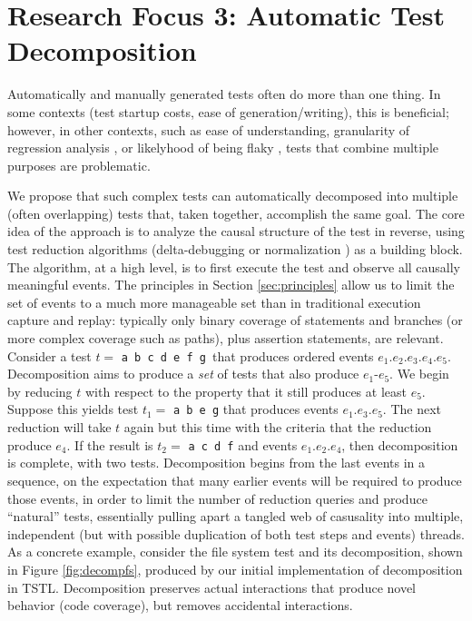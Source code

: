 
\section{Research Focus 3: Automatic Test Decomposition}

Automatically and manually generated tests often do more than one thing.  In some contexts (test startup costs, ease of generation/writing), this is beneficial; however, in other contexts, such as ease of understanding, granularity of regression analysis \cite{YooHarman}, or likelyhood of being flaky \cite{listfieldtestanalysis,palomba2017does}, tests that combine multiple purposes are problematic. 

We propose that such complex tests can automatically decomposed into multiple (often overlapping) tests that, taken together, accomplish the same goal.  The core idea of the approach is to analyze the causal structure of the test in reverse, using test reduction algorithms (delta-debugging \cite{DD} or normalization \cite{OneTest}) as a building block.  The algorithm, at a high level, is to first execute the test and observe all causally meaningful events.  The principles in Section \ref{sec:principles} allow us to limit the set of events to a much more manageable set than in traditional execution capture and replay:  typically only binary coverage of statements and branches (or more complex coverage such as paths), plus assertion statements, are relevant.  Consider a test $t=$ {\tt a b c d e f g }that produces ordered events {$e_1 . e_2 . e_3 . e_4 . e_5$}.   Decomposition aims to produce a \emph{set} of tests that also produce $e_1$-$e_5$.  We begin by reducing $t$ with respect to the property that it still produces at least $e_5$.  Suppose this yields test $t_1=$ {\tt a b e g} that produces events  {$e_1 . e_3 . e_5$}.   The next reduction will take $t$ again but this time with the criteria that the reduction produce $e_4$.  If the result is $t_2=$ {\tt a c d f} and events {$e_1 . e_2 . e_4$}, then decomposition is complete, with two tests.  Decomposition begins from the last events in a sequence, on the expectation that many earlier events will be required to produce those events, in order to limit the number of reduction queries and produce ``natural'' tests, essentially pulling apart a tangled web of casusality into multiple, independent (but with possible duplication of both test steps and events) threads.  As a concrete example, consider the file system test and its decomposition, shown in Figure \ref{fig:decompfs}, produced by our initial implementation of decomposition in TSTL.  Decomposition preserves actual interactions that produce novel behavior (code coverage), but removes accidental interactions.

